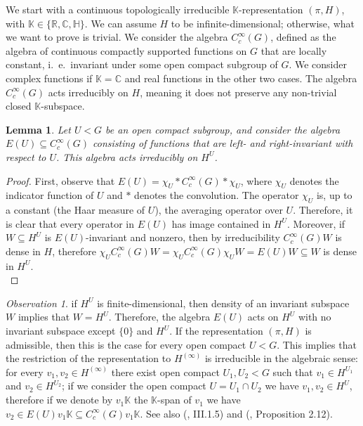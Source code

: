 \documentclass{article}
\theoremstyle{definition}
\theoremstyle{remark}
\newtheorem{obs}[dfn]{Observation}
\theoremstyle{plain}
\newtheorem{lem}[dfn]{Lemma}
\begin{document}
We start with a continuous topologically irreducible $\mathbb{K}$-representation $(\pi,H)$, with $\mathbb{K}\in\{\mathbb{R},\mathbb{C},\mathbb{H}\}$. We can assume $H$ to be infinite-dimensional; otherwise, what we want to prove is trivial. We consider the algebra $C_c^\infty(G)$, defined as the algebra of continuous compactly supported functions on $G$ that are locally constant, i.~e.~invariant under some open compact subgroup of $G$. We consider complex functions if $\mathbb{K}=\mathbb{C}$ and real functions in the other two cases. The algebra $C_c^\infty(G)$ acts irreducibly on $H$, meaning it does not preserve any non-trivial closed $\mathbb{K}$-subspace. \\

\begin{lem} \label{irred}
    Let $U<G$ be an open compact subgroup, and consider the algebra $E(U)\subseteq C_c^\infty(G)$ consisting of functions that are left- and right-invariant with respect to $U$. This algebra acts irreducibly on $H^U$.
\end{lem}

\begin{proof}
    First, observe that $E(U)=\chi_U * C_c^\infty(G) * \chi_U$, where $\chi_U$ denotes the indicator function of $U$ and $*$ denotes the convolution. The operator $\chi_U$ is, up to a constant (the Haar measure of $U$), the averaging operator over $U$. Therefore, it is clear that every operator in $E(U)$ has image contained in $H^U$. Moreover, if $W\subseteq H^U$ is $E(U)$-invariant and nonzero, then by irreducibility $C_c^\infty(G)W$ is dense in $H$, therefore $\chi_U C_c^\infty(G)W=\chi_U C_c^\infty(G)\chi_U W=E(U)W\subseteq W$ is dense in $H^U$. \\
\end{proof}

\begin{obs} \label{algirred}
    if $H^U$ is finite-dimensional, then density of an invariant subspace $W$ implies that $W=H^U$. Therefore, the algebra $E(U)$ acts on $H^U$ with no invariant subspace except $\{0\}$ and $H^U$. If the representation $(\pi,H)$ is admissible, then this is the case for every open compact $U<G$. This implies that the restriction of the representation to $H^{(\infty)}$ is irreducible in the algebraic sense: for every $v_1,v_2\in H^{(\infty)}$ there exist open compact $U_1,U_2<G$ such that $v_1\in H^{U_1}$ and $v_2\in H^{U_2}$; if we consider the open compact $U=U_1\cap U_2$ we have $v_1,v_2\in H^U$, therefore if we denote by $v_1\mathbb{K}$ the $\mathbb{K}$-span of $v_1$ we have $v_2\in E(U) v_1\mathbb{K}\subseteq C_c^\infty(G) v_1\mathbb{K}$. See also (\cite{renard}, III.1.5) and (\cite{carterwhite}, Proposition 2.12). \\
\end{obs}
\end{document}
